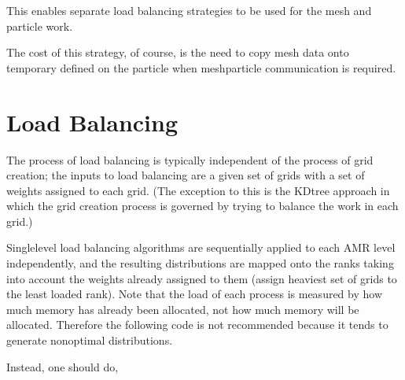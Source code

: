 \documentclass[letterpaper,10pt,english]{sphinxmanual}
\begin{document}
\sphinxAtStartPar
This enables separate load balancing strategies to be used for the mesh and particle work.

\sphinxAtStartPar
The cost of this strategy, of course, is the need to copy mesh data onto temporary
 defined on the particle  when mesh\sphinxhyphen{}particle communication
is required.


\section{Load Balancing}
\label{\detokenize{LoadBalancing:load-balancing}}\label{\detokenize{LoadBalancing:sec-load-balancing}}\label{\detokenize{LoadBalancing::doc}}
\sphinxAtStartPar
The process of load balancing is typically independent of the process of grid creation;
the inputs to load balancing are a given set of grids with a set of weights
assigned to each grid.  (The exception to this is the KD\sphinxhyphen{}tree approach in which the
grid creation process is governed by trying to balance the work in each grid.)

\sphinxAtStartPar
Single\sphinxhyphen{}level load balancing algorithms are sequentially applied to each AMR level independently,
and the resulting distributions are mapped onto the ranks taking into account the weights
already assigned to them (assign heaviest set of grids to the least loaded rank).  Note that the
load of each process is measured by how much memory has already been allocated, not how much memory
will be allocated.  Therefore the following code is not recommended because it tends to generate
non\sphinxhyphen{}optimal distributions.

\begin{sphinxVerbatim}[commandchars=\\\{\}]
         
         
\end{sphinxVerbatim}

\sphinxAtStartPar
Instead, one should do,
\end{document}
